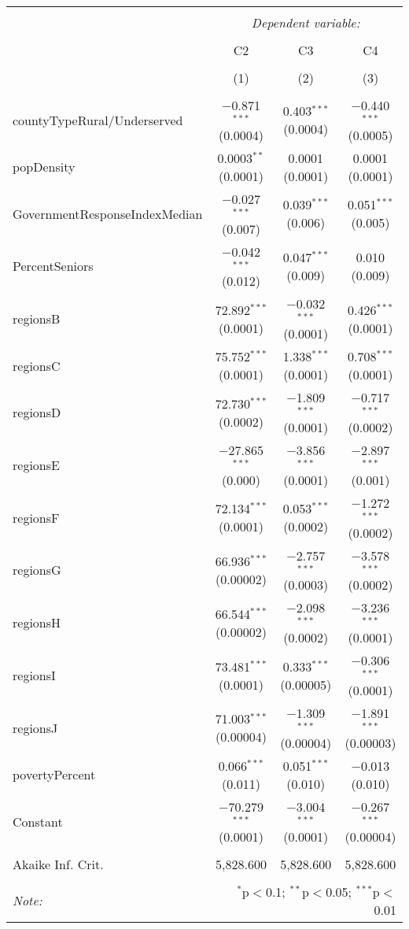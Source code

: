 
\begin{table}[!htbp] \centering 
  \caption{} 
  \label{} 
\begin{tabular}{@{\extracolsep{5pt}}lccc} 
\\[-1.8ex]\hline 
\hline \\[-1.8ex] 
 & \multicolumn{3}{c}{\textit{Dependent variable:}} \\ 
\cline{2-4} 
\\[-1.8ex] & C2 & C3 & C4 \\ 
\\[-1.8ex] & (1) & (2) & (3)\\ 
\hline \\[-1.8ex] 
 countyTypeRural/Underserved & $-$0.871$^{***}$ (0.0004) & 0.403$^{***}$ (0.0004) & $-$0.440$^{***}$ (0.0005) \\ 
  popDensity & 0.0003$^{**}$ (0.0001) & 0.0001 (0.0001) & 0.0001 (0.0001) \\ 
  GovernmentResponseIndexMedian & $-$0.027$^{***}$ (0.007) & 0.039$^{***}$ (0.006) & 0.051$^{***}$ (0.005) \\ 
  PercentSeniors & $-$0.042$^{***}$ (0.012) & 0.047$^{***}$ (0.009) & 0.010 (0.009) \\ 
  regionsB & 72.892$^{***}$ (0.0001) & $-$0.032$^{***}$ (0.0001) & 0.426$^{***}$ (0.0001) \\ 
  regionsC & 75.752$^{***}$ (0.0001) & 1.338$^{***}$ (0.0001) & 0.708$^{***}$ (0.0001) \\ 
  regionsD & 72.730$^{***}$ (0.0002) & $-$1.809$^{***}$ (0.0001) & $-$0.717$^{***}$ (0.0002) \\ 
  regionsE & $-$27.865$^{***}$ (0.000) & $-$3.856$^{***}$ (0.0001) & $-$2.897$^{***}$ (0.001) \\ 
  regionsF & 72.134$^{***}$ (0.0001) & 0.053$^{***}$ (0.0002) & $-$1.272$^{***}$ (0.0002) \\ 
  regionsG & 66.936$^{***}$ (0.00002) & $-$2.757$^{***}$ (0.0003) & $-$3.578$^{***}$ (0.0002) \\ 
  regionsH & 66.544$^{***}$ (0.00002) & $-$2.098$^{***}$ (0.0002) & $-$3.236$^{***}$ (0.0001) \\ 
  regionsI & 73.481$^{***}$ (0.0001) & 0.333$^{***}$ (0.00005) & $-$0.306$^{***}$ (0.0001) \\ 
  regionsJ & 71.003$^{***}$ (0.00004) & $-$1.309$^{***}$ (0.00004) & $-$1.891$^{***}$ (0.00003) \\ 
  povertyPercent & 0.066$^{***}$ (0.011) & 0.051$^{***}$ (0.010) & $-$0.013 (0.010) \\ 
  Constant & $-$70.279$^{***}$ (0.0001) & $-$3.004$^{***}$ (0.0001) & $-$0.267$^{***}$ (0.00004) \\ 
 \hline \\[-1.8ex] 
Akaike Inf. Crit. & 5,828.600 & 5,828.600 & 5,828.600 \\ 
\hline 
\hline \\[-1.8ex] 
\textit{Note:}  & \multicolumn{3}{r}{$^{*}$p$<$0.1; $^{**}$p$<$0.05; $^{***}$p$<$0.01} \\ 
\end{tabular} 
\end{table} 
